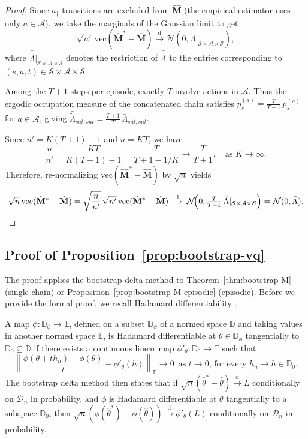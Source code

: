 \documentclass{article}
\numberwithin{equation}{section}
\begin{document}
\begin{proof}
Since $a_\dagger$-transitions are excluded from $\hat{\mathbf{M}}$ (the empirical estimator uses only $a\in\mathcal{A}$), we take the marginals of the Gaussian limit to get 
\[
\sqrt{n'}\,\mathrm{vec}(\hat{\mathbf{M}}^\ast-\hat{\mathbf{M}})\xrightarrow{\mathrm{d}}\mathcal{N}(0,\bar{\widetilde\Lambda}|_{\mathcal{S}\times\mathcal{A}\times\mathcal{S}}),
\] 
where $\bar{\widetilde\Lambda}|_{\mathcal{S}\times\mathcal{A}\times\mathcal{S}}$ denotes the restriction of $\bar{\widetilde\Lambda}$ to the entries corresponding to $(s,a,t)\in\mathcal{S}\times\mathcal{A}\times\mathcal{S}$.

Among the $T+1$ steps per episode, exactly $T$ involve actions in $\mathcal{A}$. Thus the ergodic occupation measure of the concatenated chain satisfies $\tilde p_s^{(a)}=\tfrac{T}{T+1}\,p_s^{(a)}$ for $a\in\mathcal{A}$, giving $\bar{\widetilde\Lambda}_{sat,sat}=\tfrac{T+1}{T}\,\bar\Lambda_{sat,sat}$.

Since $n'=K(T+1)-1$ and $n=K T$, we have 
\[
\frac{n}{n'} = \frac{KT}{K(T+1)-1} = \frac{T}{T+1-1/K} \to \frac{T}{T+1}, \quad \text{as } K\to\infty.
\]
Therefore, re-normalizing $\mathrm{vec}(\hat{\mathbf{M}}^\ast-\hat{\mathbf{M}})$ by $\sqrt{n}$ yields
\[
\sqrt{n}\,\mathrm{vec}(\hat{\mathbf{M}}^\ast-\hat{\mathbf{M}}) = \sqrt{\frac{n}{n'}}\,\sqrt{n'}\,\mathrm{vec}(\hat{\mathbf{M}}^\ast-\hat{\mathbf{M}})
\;\xrightarrow{\mathrm{d}}\;
\mathcal{N}\!\Bigl(0,\tfrac{T}{T+1}\,\bar{\widetilde\Lambda}|_{\mathcal{S}\times\mathcal{A}\times\mathcal{S}}\Bigr)
= \mathcal{N}(0,\bar\Lambda). \qedhere
\]
\end{proof}

\subsection{Proof of Proposition~\ref{prop:bootstrap-vq}}
\label{app:proof-cor-vq}
The proof applies the bootstrap delta method to Theorem~\ref{thm:bootstrap-M} (single-chain) or Proposition~\ref{prop:bootstrap-M-episodic} (episodic).
Before we provide the formal proof, we recall Hadamard differentiability \citep[Chapter 20.2]{van_der_vaart_asymptotic_2000}.

A map $\phi:\mathbb{D}_\phi \to\mathbb{E}$, defined on a subset $\mathbb{D}_\phi$ of a normed space $\mathbb{D}$ and taking values in another normed space $\mathbb{E}$, is Hadamard differentiable at $\theta\in\mathbb{D}_\phi$ tangentially to $\mathbb{D}_0\subseteq\mathbb{D}$ if there exists a continuous linear map $\phi'_\theta:\mathbb{D}_0\to\mathbb{E}$ such that 
\[
\left\|\frac{\phi(\theta+t h_n)-\phi(\theta)}{t} - \phi'_\theta(h)\right\|_\mathbb{E}\to 0 \, \text{ as $t \to 0$, for every $h_n\to h\in\mathbb{D}_0$}.
\]
The bootstrap delta method \citep[Theorem 23.9]{van_der_vaart_asymptotic_2000} then states that if $\sqrt{n}(\hat\theta^\ast-\hat\theta)\xrightarrow{\mathrm{d}} L$ conditionally on $\mathcal{D}_n$ in probability, and $\phi$ is Hadamard differentiable at $\theta$ tangentially to a subspace $\mathbb{D}_0$, then $\sqrt{n}(\phi(\hat\theta^\ast)-\phi(\hat\theta))\xrightarrow{\mathrm{d}}\phi'_\theta(L)$ conditionally on $\mathcal{D}_n$ in probability.
\end{document}
